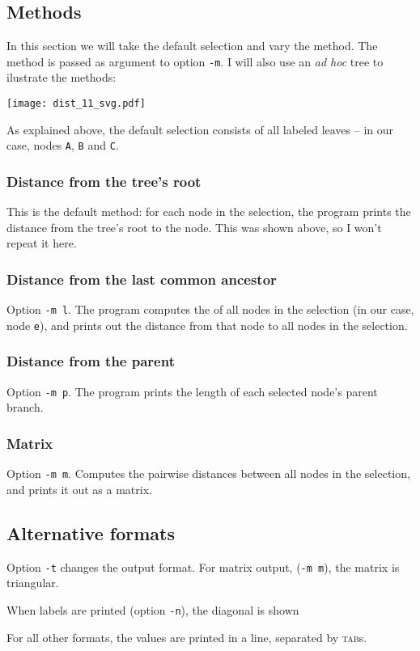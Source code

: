 \subsection{Methods}

In this section we will take the default selection and vary the method. The
method is passed as argument to option \texttt{-m}. I will also use an
\emph{ad hoc} tree to ilustrate the methods:


\begin{center}
\texttt{[image: dist\_11\_svg.pdf]}
\end{center}

\noindent{}As explained above, the default selection consists of all labeled
leaves -- in our case, nodes \texttt{A}, \texttt{B} and \texttt{C}. 

\subsubsection{Distance from the tree's root}

This is the default method: for each node in the selection, the program prints
the distance from the tree's root to the node. This was shown above, so I
won't repeat it here.

\subsubsection{Distance from the last common ancestor}
Option \texttt{-m l}. The program computes the \lca{} of all nodes in the
selection (in our case, node \texttt{e}), and prints out the distance from
that node to all nodes in the selection.



\subsubsection{Distance from the parent}
Option \texttt{-m p}. The program prints the length of each selected node's
parent branch.



\subsubsection{Matrix}
Option \texttt{-m m}. Computes the pairwise distances between all nodes in the
selection, and prints it out as a matrix.



\subsection{Alternative formats}

Option \texttt{-t} changes the output format. For matrix output, (\texttt{-m
m}), the matrix is triangular. 


When labels are printed (option \texttt{-n}), the diagonal is shown



For all other formats, the values are printed in a line, separated by
\textsc{tab}s.



